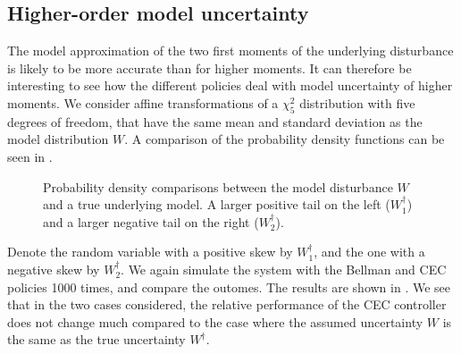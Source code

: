 \documentclass[main.tex]{subfiles}
\begin{document}
\subsection{Higher-order model uncertainty}
The model approximation of the two first moments of the underlying
disturbance is likely to be more accurate than for higher moments.
It can therefore be interesting to see how the different
policies deal with model uncertainty of higher moments.
We consider affine transformations of a $\chi^2_5$ distribution with five degrees of
freedom, that have the same mean and standard deviation as the model
distribution $W$. A comparison of the probability density
functions can be seen in .
\begin{figure}[htbp]
  \centering
  \begin{subfigure}[b]{0.5\textwidth}
  \end{subfigure}%
  \begin{subfigure}[b]{0.5\textwidth}
  \end{subfigure}
  \caption{Probability density comparisons between
    the model disturbance $W$ and a true underlying
    model. A larger positive tail on the left ($W_1^\dagger$) and
    a larger negative tail on the right ($W_2^\dagger$).
  }\label{fig:chisq_transformed}
\end{figure}
Denote the random variable with a positive skew by $W_1^\dagger$, and
the one with a negative skew by $W_2^\dagger$.
We again simulate the system with the Bellman and CEC policies 1000
times, and compare the outomes. The results are shown in
. We see that in the two cases considered,
the relative performance of the CEC controller does not change much
compared to the case where the assumed uncertainty $W$ is the same as
the true uncertainty $W^\dagger$.
\end{document}
